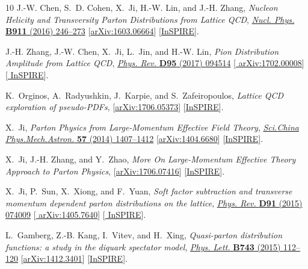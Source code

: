 \begin{thebibliography}{10}
J.-W. Chen, S.~D. Cohen, X.~Ji, H.-W. Lin, and J.-H. Zhang, {\it {Nucleon
  Helicity and Transversity Parton Distributions from Lattice QCD}},
\href{http://dx.doi.org/10.1016/j.nuclphysb.2016.07.033}{{\em Nucl. Phys.}
  {\bfseries B911} (2016) 246--273}
  [\href{http://arxiv.org/abs/1603.06664}{{\ttfamily arXiv:1603.06664}}]
  [\href{http://inspirehep.net/record/1431989}{{\ttfamily InSPIRE}}].

J.-H. Zhang, J.-W. Chen, X.~Ji, L.~Jin, and H.-W. Lin, {\it {Pion Distribution
  Amplitude from Lattice QCD}},
\href{http://dx.doi.org/10.1103/PhysRevD.95.094514}{{\em Phys. Rev.} {\bfseries
  D95} (2017) 094514} [\href{http://arxiv.org/abs/1702.00008}{{\ttfamily
  arXiv:1702.00008}}] [\href{http://inspirehep.net/record/1511678}{{\ttfamily
  InSPIRE}}].

K.~Orginos, A.~Radyushkin, J.~Karpie, and S.~Zafeiropoulos,
{\it {Lattice QCD exploration of pseudo-PDFs}},
  [\href{http://arxiv.org/abs/1706.05373}{{\ttfamily arXiv:1706.05373}}]
  [\href{http://inspirehep.net/record/1605575}{{\ttfamily InSPIRE}}].

X.~Ji, {\it {Parton Physics from Large-Momentum Effective Field Theory}},
\href{http://dx.doi.org/10.1007/s11433-014-5492-3}{{\em Sci.China
  Phys.Mech.Astron.} {\bfseries 57} (2014) 1407--1412}
  [\href{http://arxiv.org/abs/1404.6680}{{\ttfamily arXiv:1404.6680}}]
  [\href{http://inspirehep.net/record/1292804}{{\ttfamily InSPIRE}}].

X.~Ji, J.-H. Zhang, and Y.~Zhao,
{\it {More On Large-Momentum Effective Theory Approach to Parton Physics}},
  [\href{http://arxiv.org/abs/1706.07416}{{\ttfamily arXiv:1706.07416}}]
  [\href{http://inspirehep.net/record/1606344}{{\ttfamily InSPIRE}}].

X.~Ji, P.~Sun, X.~Xiong, and F.~Yuan, {\it {Soft factor subtraction and
  transverse momentum dependent parton distributions on the lattice}},
\href{http://dx.doi.org/10.1103/PhysRevD.91.074009}{{\em Phys. Rev.} {\bfseries
  D91} (2015) 074009} [\href{http://arxiv.org/abs/1405.7640}{{\ttfamily
  arXiv:1405.7640}}] [\href{http://inspirehep.net/record/1298525}{{\ttfamily
  InSPIRE}}].

L.~Gamberg, Z.-B. Kang, I.~Vitev, and H.~Xing, {\it {Quasi-parton distribution
  functions: a study in the diquark spectator model}},
\href{http://dx.doi.org/10.1016/j.physletb.2015.02.021}{{\em Phys. Lett.}
  {\bfseries B743} (2015) 112--120}
  [\href{http://arxiv.org/abs/1412.3401}{{\ttfamily arXiv:1412.3401}}]
  [\href{http://inspirehep.net/record/1333669}{{\ttfamily InSPIRE}}].


\end{thebibliography}
